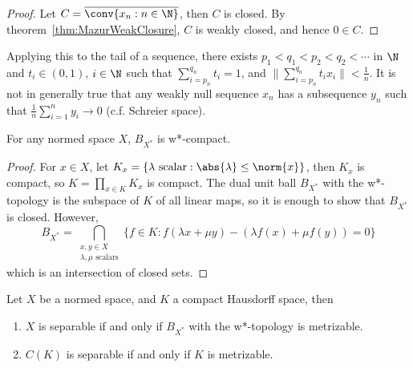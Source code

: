 \documentclass[a4paper]{article}
\begin{document}
\begin{proof}
  Let $C=\overline{\conv\{x_n:n\in\N\}}$, then $C$ is closed. By theorem~\ref{thm:MazurWeakClosure}, $C$ is weakly closed, and hence $0\in C$.
\end{proof}

\begin{remark}
  Applying this to the tail of a sequence, there exists $p_1<q_1<p_2<q_2<\cdots$ in $\N$ and $t_i\in(0,1)$, $i\in\N$ such that $\sum_{i=p_n}^{q_n}t_i=1$, and $\big\|\sum_{i=p_n}^{q_n}t_ix_i\big\|<\frac{1}{n}$. It is not in generally true that any weakly null sequence $x_n$ has a subsequence $y_n$ such that $\frac{1}{n}\sum_{i=1}^n y_i\to 0$ (c.f. Schreier space).
\end{remark}

\begin{nthm}\label{thm:BanachAlaoglu}
  For any normed space $X$, $B_{X^*}$ is w*-compact.
\end{nthm}
\begin{proof}
  For $x\in X$, let $K_x=\{\lambda\text{ scalar}:\abs{\lambda}\leq\norm{x}\}$, then $K_x$ is compact, so $K=\prod_{x\in K}K_x$ is compact. The dual unit ball $B_{X^*}$ with the w*-topology is the subspace of $K$ of all linear maps, so it is enough to show that $B_{X^*}$ is closed. However,
  \[
    B_{X^*}=\bigcap_{\substack{x,y\in X\\ \lambda,\mu\text{ scalars}}}\{f\in K:f(\lambda x+\mu y)-(\lambda f(x)+\mu f(y))=0\}
  \]
which is an intersection of closed sets.
\end{proof}

\begin{nprop}\label{prop:DualBallMetrizable}
	 Let $X$ be a normed space, and $K$ a compact Hausdorff space, then
	\begin{enumerate}[label=(\roman*)]
		\item $X$ is separable if and only if $B_{X^*}$ with the w*-topology is metrizable.
		\item $C(K)$ is separable if and only if $K$ is metrizable.
	\end{enumerate}
\end{nprop}
\end{document}

